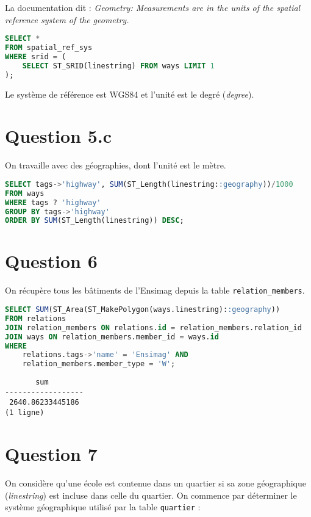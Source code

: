 \documentclass[12pt]{article}
\begin{document}
La documentation dit : \textit{Geometry: Measurements are in the units of the spatial reference system of the geometry.}

\begin{lstlisting}[language=SQL]
SELECT *
FROM spatial_ref_sys
WHERE srid = (
    SELECT ST_SRID(linestring) FROM ways LIMIT 1
);
\end{lstlisting}

Le système de référence est WGS84 et l'unité est le degré (\textit{degree}).

\section*{Question 5.c}

On travaille avec des géographies, dont l'unité est le mètre.

\begin{lstlisting}[language=SQL]
SELECT tags->'highway', SUM(ST_Length(linestring::geography))/1000
FROM ways
WHERE tags ? 'highway'
GROUP BY tags->'highway'
ORDER BY SUM(ST_Length(linestring)) DESC;
\end{lstlisting}

\newpage

\section*{Question 6}

On récupère tous les bâtiments de l'Ensimag depuis la table \verb?relation_members?.

\begin{lstlisting}[language=SQL]
SELECT SUM(ST_Area(ST_MakePolygon(ways.linestring)::geography))
FROM relations
JOIN relation_members ON relations.id = relation_members.relation_id
JOIN ways ON relation_members.member_id = ways.id
WHERE
    relations.tags->'name' = 'Ensimag' AND
    relation_members.member_type = 'W';
\end{lstlisting}

\begin{lstlisting}
       sum
------------------
 2640.86233445186
(1 ligne)
\end{lstlisting}

\newpage

\section*{Question 7}

On considère qu'une école est contenue dans un quartier si sa zone géographique (\textit{linestring})
est incluse dans celle du quartier. On commence par déterminer le système
géographique utilisé par la table \verb?quartier? :
\end{document}
